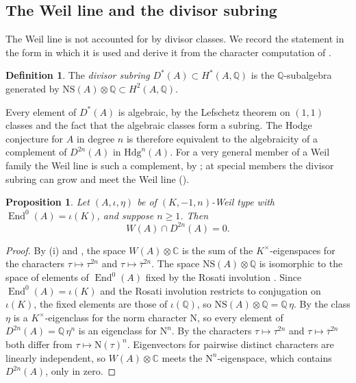 \documentclass[11pt,reqno]{amsart}
\theoremstyle{plain}
\newtheorem{proposition}[theorem]{Proposition}
\theoremstyle{definition}
\newtheorem{definition}[theorem]{Definition}
\theoremstyle{remark}
\newcommand{\QQ}{\mathbb{Q}}
\newcommand{\CC}{\mathbb{C}}
\newcommand{\Hdg}{\mathrm{Hdg}}
\newcommand{\HW}{W}                      %
\newcommand{\NS}{\mathrm{NS}}
\newcommand{\Nm}{\mathrm{N}}             %
\DeclareMathOperator{\End}{End}
\newcommand{\Kx}{K^{\times}}
\newcommand{\bbar}[1]{\overline{#1}}
\begin{document}
\subsection{The Weil line and the divisor subring}

The Weil line is not accounted for by divisor classes. We record the
statement in the form in which it is used and derive it from the character
computation of .

\begin{definition}\label{def:divisorsubring}
The \emph{divisor subring} $D^{*}(A)\subset H^{*}(A,\QQ)$ is the
$\QQ$-subalgebra generated by $\NS(A)\otimes\QQ\subset H^{2}(A,\QQ)$.
\end{definition}

Every element of $D^{*}(A)$ is algebraic, by the Lefschetz theorem on $(1,1)$
classes and the fact that the algebraic classes form a subring. The Hodge
conjecture for $A$ in degree $n$ is therefore equivalent to the algebraicity
of a complement of $D^{2n}(A)$ in $\Hdg^{n}(A)$. For a very general member of
a Weil family the Weil line is such a complement, by ; at
special members the divisor subring can grow and meet the Weil line
(\cite[Remark~2.5]{paperIII}).

\begin{proposition}\label{prop:notpoly}
Let $(A,\iota,\eta)$ be of $(K,-1,n)$-Weil type with
$\End^{0}(A)=\iota(K)$, and suppose $n\ge1$. Then
\[
  \HW(A)\cap D^{2n}(A)=0 .
\]
\end{proposition}

\begin{proof}
By (i) and , the space
$\HW(A)\otimes\CC$ is the sum of the $\Kx$-eigenspaces for the characters
$\tau\mapsto\tau^{2n}$ and $\tau\mapsto\bbar{\tau}^{2n}$. The space
$\NS(A)\otimes\QQ$ is isomorphic to the space of elements of $\End^{0}(A)$
fixed by the Rosati involution \cite[Section~5.2]{BL04}. Since
$\End^{0}(A)=\iota(K)$ and the Rosati involution restricts to conjugation on
$\iota(K)$, the fixed elements are those of $\iota(\QQ)$, so
$\NS(A)\otimes\QQ=\QQ\,\eta$. By  the class $\eta$ is a
$\Kx$-eigenclass for the norm character $\Nm$, so every element of
$D^{2n}(A)=\QQ\,\eta^{n}$ is an eigenclass for $\Nm^{n}$. By
 the characters $\tau\mapsto\tau^{2n}$ and
$\tau\mapsto\bbar{\tau}^{2n}$ both differ from $\tau\mapsto\Nm(\tau)^{n}$.
Eigenvectors for pairwise distinct characters are linearly independent, so
$\HW(A)\otimes\CC$ meets the $\Nm^{n}$-eigenspace, which contains
$D^{2n}(A)$, only in zero.
\end{proof}
\end{document}
